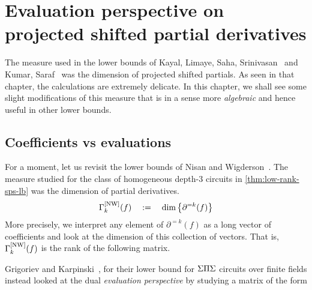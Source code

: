 \chapter{Evaluation perspective on projected shifted partial derivatives}\label{chap:PSPD-more}

The measure used in the lower bounds of Kayal, Limaye, Saha, Srinivasan~\cite{KLSS} and Kumar, Saraf~\cite{KS14} was the dimension of projected shifted partials.
As seen in that chapter, the calculations are extremely delicate.
In this chapter, we shall see some slight modifications of this measure that is in a sense more \emph{algebraic} and hence useful in other lower bounds. 

\section{Coefficients vs evaluations}

For a moment, let us revisit the lower bounds of Nisan and Wigderson~\cite{nw1997}. The measure studied for the class of homogeneous depth-$3$ circuits in \autoref{thm:low-rank-sps-lb} was the dimension of partial derivatives. 
\[
\Gamma^{\mathrm{[NW]}}_k(f) \quad := \quad \dim\left\{\partial^{=k}(f)\right\}
\]
More precisely, we interpret any element of $\partial^{=k}(f)$ as a long vector of coefficients and look at the dimension of this collection of vectors. That is, $\Gamma^{\mathrm{[NW]}}_k(f)$ is the rank of the following matrix. 


Grigoriev and Karpinski~\cite{grigoriev98}, for their lower bound for $\Sigma\Pi\Sigma$ circuits over finite fields instead looked at the dual \emph{evaluation perspective} by studying a matrix of the form


